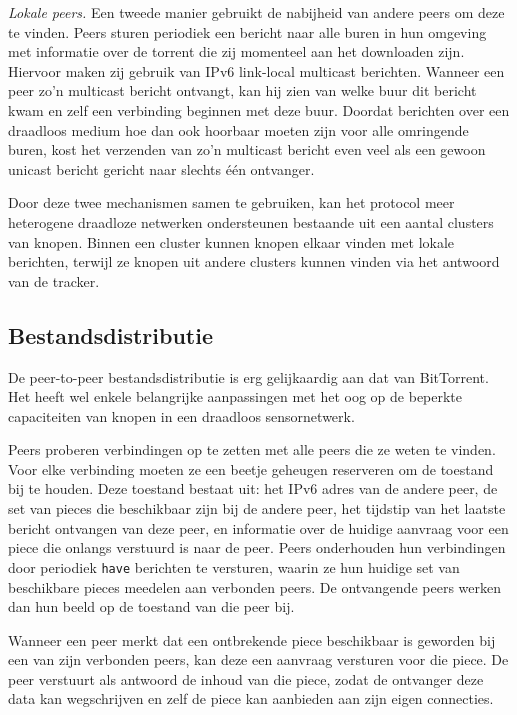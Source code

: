 \documentclass[journal]{IEEEtran}
\begin{document}
\emph{Lokale peers.} Een tweede manier gebruikt de nabijheid van andere peers om deze te vinden. Peers sturen periodiek een bericht naar alle buren in hun omgeving met informatie over de torrent die zij momenteel aan het downloaden zijn. Hiervoor maken zij gebruik van IPv6 link-local multicast berichten. Wanneer een peer zo'n multicast bericht ontvangt, kan hij zien van welke buur dit bericht kwam en zelf een verbinding beginnen met deze buur. Doordat berichten over een draadloos medium hoe dan ook hoorbaar moeten zijn voor alle omringende buren, kost het verzenden van zo'n multicast bericht even veel als een gewoon unicast bericht gericht naar slechts \'e\'en ontvanger.

Door deze twee mechanismen samen te gebruiken, kan het protocol meer heterogene draadloze netwerken ondersteunen bestaande uit een aantal clusters van knopen. Binnen een cluster kunnen knopen elkaar vinden met lokale berichten, terwijl ze knopen uit andere clusters kunnen vinden via het antwoord van de tracker.

\subsection{Bestandsdistributie}
De peer-to-peer bestandsdistributie is erg gelijkaardig aan dat van BitTorrent. Het heeft wel enkele belangrijke aanpassingen met het oog op de beperkte capaciteiten van knopen in een draadloos sensornetwerk.

Peers proberen verbindingen op te zetten met alle peers die ze weten te vinden. Voor elke verbinding moeten ze een beetje geheugen reserveren om de toestand bij te houden. Deze toestand bestaat uit: het IPv6 adres van de andere peer, de set van pieces die beschikbaar zijn bij de andere peer, het tijdstip van het laatste bericht ontvangen van deze peer, en informatie over de huidige aanvraag voor een piece die onlangs verstuurd is naar de peer. Peers onderhouden hun verbindingen door periodiek \texttt{have} berichten te versturen, waarin ze hun huidige set van beschikbare pieces meedelen aan verbonden peers. De ontvangende peers werken dan hun beeld op de toestand van die peer bij.

Wanneer een peer merkt dat een ontbrekende piece beschikbaar is geworden bij een van zijn verbonden peers, kan deze een aanvraag versturen voor die piece. De peer verstuurt als antwoord de inhoud van die piece, zodat de ontvanger deze data kan wegschrijven en zelf de piece kan aanbieden aan zijn eigen connecties.
\end{document}

